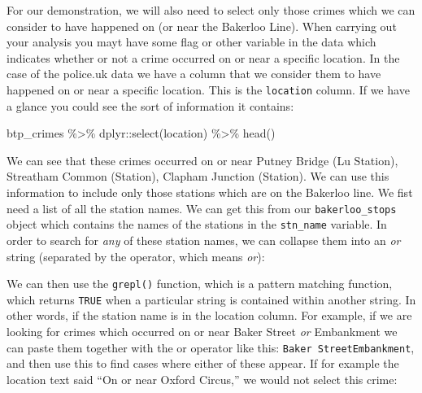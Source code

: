 \documentclass[
  krantz2]{krantz}
\makeatletter
\newenvironment{Shaded}{\begin{snugshade}}{\end{snugshade}}
\newcommand{\AttributeTok}[1]{\textcolor[rgb]{0.61,0.61,0.61}{#1}}
\newcommand{\FunctionTok}[1]{\textcolor[rgb]{0,0,0}{#1}}
\newcommand{\NormalTok}[1]{#1}
\newcommand{\OtherTok}[1]{\textcolor[rgb]{0.37,0.37,0.37}{#1}}
\newcommand{\SpecialCharTok}[1]{\textcolor[rgb]{0,0,0}{#1}}
\newcommand{\StringTok}[1]{\textcolor[rgb]{0.5,0.5,0.5}{#1}}
\newenvironment{kframe}{%
\medskip{}
\setlength{\fboxsep}{.8em}
 \def\at@end@of@kframe{}%
 \ifinner\ifhmode%
  \def\at@end@of@kframe{\end{minipage}}%
  \begin{minipage}{\columnwidth}%
 \fi\fi%
 \def\FrameCommand##1{\hskip\@totalleftmargin \hskip-\fboxsep
 \colorbox{shadecolor}{##1}\hskip-\fboxsep
     \hskip-\linewidth \hskip-\@totalleftmargin \hskip\columnwidth}%
 \MakeFramed {\advance\hsize-\width
   \@totalleftmargin\z@ \linewidth\hsize
   \@setminipage}}%
 {\par\unskip\endMakeFramed%
 \at@end@of@kframe}
\renewenvironment{Shaded}{\begin{kframe}}{\end{kframe}}
\makeatother
\begin{document}
For our demonstration, we will also need to select only those crimes which we can consider to have happened on (or near the Bakerloo Line). When carrying out your analysis you mayt have some flag or other variable in the data which indicates whether or not a crime occurred on or near a specific location. In the case of the police.uk data we have a column that we consider them to have happened on or near a specific location. This is the \texttt{location} column. If we have a glance you could see the sort of information it contains:

\begin{Shaded}
\begin{Highlighting}[]
\NormalTok{btp\_crimes }\SpecialCharTok{\%\textgreater{}\%}\NormalTok{ dplyr}\SpecialCharTok{::}\FunctionTok{select}\NormalTok{(location) }\SpecialCharTok{\%\textgreater{}\%} \FunctionTok{head}\NormalTok{()}
\end{Highlighting}
\end{Shaded}

We can see that these crimes occurred on or near Putney Bridge (Lu Station), Streatham Common (Station), Clapham Junction (Station). We can use this information to include only those stations which are on the Bakerloo line. We fist need a list of all the station names. We can get this from our \texttt{bakerloo\_stops} object which contains the names of the stations in the \texttt{stn\_name} variable. In order to search for \emph{any} of these station names, we can collapse them into an \emph{or} string (separated by the \texttt{\textbar{}} operator, which means \emph{or}):

\begin{Shaded}
\end{Shaded}

We can then use the \texttt{grepl()} function, which is a pattern matching function, which returns \texttt{TRUE} when a particular string is contained within another string. In other words, if the station name is in the location column. For example, if we are looking for crimes which occurred on or near Baker Street \emph{or} Embankment we can paste them together with the or operator like this: \texttt{Baker\ Street\textbar{}Embankment}, and then use this to find cases where either of these appear. If for example the location text said ``On or near Oxford Circus,'' we would not select this crime:
\end{document}
